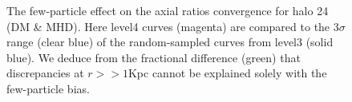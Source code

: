 \begin{figure}[!ht]
  \centering
  \hfill
  \caption{The few-particle effect on the axial ratios convergence for halo 24 (DM \& MHD). Here level4 curves (magenta) are compared to  the 3$\sigma$ range (clear blue) of the random-sampled curves from level3 (solid blue). We deduce from the fractional difference (green) that discrepancies at $r>>1$Kpc cannot be explained solely with the few-particle bias. }
  \label{fig:convergence}  
\end{figure}


